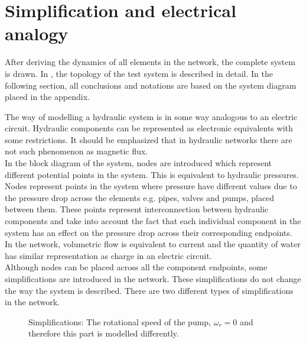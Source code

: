 \section{Simplification and electrical analogy}  
\label{SystemModel}

After deriving the dynamics of all elements in the network, the complete system is drawn. In , the topology of the test system is described in detail. In the following section, all conclusions and notations are based on the system diagram placed in the appendix. 

The way of modelling a hydraulic system is in some way analogous to an electric circuit. Hydraulic components can be represented as electronic equivalents with some restrictions. It should be emphasized that in hydraulic networks there are not such phenomenon as magnetic flux. 
\\
In the block diagram of the system, nodes are introduced which represent different potential points in the system. This is equivalent to hydraulic pressures. Nodes represent points in the system where pressure have different values due to the pressure drop across the elements e.g. pipes, valves and pumps, placed between them. These points represent interconnection between hydraulic components and take into account the fact that each individual component in the system has an effect on the pressure drop across their corresponding endpoints.
\\
In the network, volumetric flow is equivalent to current and the quantity of water has similar representation as charge in an electric circuit. 
\\ 
Although nodes can be placed across all the component endpoints, some simplifications are introduced in the network. These simplifications do not change the way the system is described. There are two different types of simplifications in the network. %


\begin{figure}[H]
	\centering
	 
	\caption{Simplifications: The rotational speed of the pump, $\omega_r = 0$ and therefore this part is modelled differently.}
	  \label{fig:subsys_1}
\end{figure}

